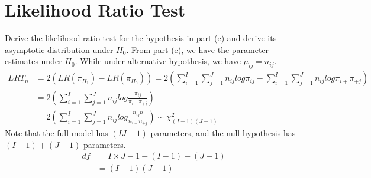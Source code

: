 
\section{Likelihood Ratio Test}

Derive the likelihood ratio test for the hypothesis in part (e) and derive its asymptotic distribution under $H_0$.
From part (e), we have the parameter estimates under $H_0$. While under alternative hypothesis, we have $\mu_{ij} = n_{ij}$. 
\begin{align*}
	LRT_n &= 2(LR(\pi_{H_1}) - LR(\pi_{H_0})) =2\left( \sum_{i=1}^I \sum_{j=1}^J n_{ij} log \pi_{ij} - \sum_{i=1}^I \sum_{j=1}^J n_{ij} log \pi_{i+} \pi_{+j} \right)\\
	&= 2\left( \sum_{i=1}^I \sum_{j=1}^J n_{ij} log \frac{\pi_{ij}}{\pi_{i+} \pi_{+j} }   \right)\\
	&= 2\left( \sum_{i=1}^I \sum_{j=1}^J n_{ij} log \frac{n_{ij} n}{n_{i+} n_{+j} }   \right) \sim \chi^2_{(I-1)(J-1)} 
\end{align*}
Note that the full model has $(IJ-1)$ parameters, and the null hypothesis has $(I-1)+ (J-1)$ parameters.
\begin{align*}
	df &= I \times J-1 - (I-1) - (J-1)\\
	&= (I-1)(J-1)
\end{align*}

